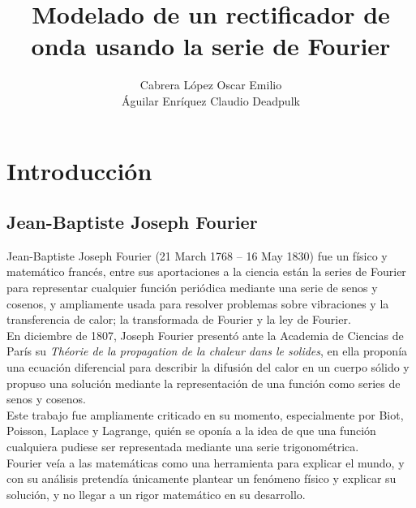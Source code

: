 \documentclass[a4paper,12pt]{article}
\title{Modelado de un rectificador de onda usando la serie de Fourier}
\author{
  Cabrera López Oscar Emilio\\
  Águilar Enríquez Claudio Deadpulk
}
\begin{document}
\thispagestyle{fancy}
\maketitle
\newpage
\tableofcontents
\newpage

\section{Introducción}

\subsection{Jean-Baptiste Joseph Fourier}
\indent Jean-Baptiste Joseph Fourier (21 March 1768 – 16 May 1830) fue un físico y matemático francés, entre sus aportaciones a la ciencia están la series de Fourier para representar cualquier función periódica mediante una serie de senos y cosenos, y ampliamente usada para resolver problemas sobre vibraciones y la transferencia de calor; la transformada de Fourier y la ley de Fourier.\\
\indent En diciembre de 1807, Joseph Fourier presentó ante la Academia de Ciencias de París su \textit{Théorie de la propagation de la chaleur dans le solides}, en ella proponía una ecuación diferencial para describir la difusión del calor en un cuerpo sólido y propuso una solución mediante la representación de una función como series de senos y cosenos.\\
\indent Este trabajo fue ampliamente criticado en su momento, especialmente por Biot, Poisson, Laplace y Lagrange, quién se oponía a la idea de que una función cualquiera pudiese ser representada mediante una serie trigonométrica.\\
\indent Fourier veía a las matemáticas como una herramienta para explicar el mundo, y con su análisis pretendía únicamente plantear un fenómeno físico y explicar su solución, y no llegar a un rigor matemático en su desarrollo.
\end{document}
